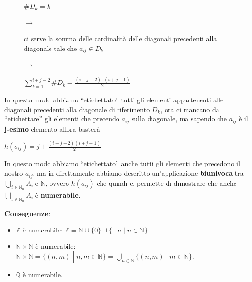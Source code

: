 \begin{figure}[h]
    \centering
    \begin{minipage}[t]{0.15\textwidth}
        \centering
        $\#D_k = k$
    \end{minipage}
    $\rightarrow$
    \begin{minipage}[t]{0.4\textwidth}
        \centering
        ci serve la somma delle cardinalità delle diagonali precedenti alla diagonale tale che $a_{ij} \in D_k$
    \end{minipage}
    $\rightarrow$
    \begin{minipage}[t]{0.35\textwidth}
        \centering
        $\sum^{i+j-2}_{k=1} \#D_k = \frac{(i + j - 2) \cdot (i + j - 1)}{2}$
    \end{minipage}
\end{figure}
In questo modo abbiamo ``etichettato'' tutti gli elementi appartenenti alle diagonali precedenti alla diagonale di riferimento $D_k$, ora ci mancano da ``etichettare'' gli elementi che precendo $a_{ij}$ sulla diagonale, ma sapendo che $a_{ij}$ è il \textbf{j-esimo} elemento allora basterà:
\begin{center}
    $h(a_{ij}) = j + \frac{(i + j - 2)(i + j - 1)}{2}$
\end{center}
In questo modo abbiamo ``etichettato'' anche tutti gli elementi che precedono il nostro $a_{ij}$, ma in direttamente abbiamo descritto un'applicazione \textbf{biunivoca} tra $\bigcup_{i \in \mathbb{N}_n} A_i$ e $\mathbb{N}$, ovvero $h(a_{ij})$ che quindi ci permette di dimostrare che anche $\bigcup_{i \in \mathbb{N}_n} A_i$ è \textbf{numerabile}.

\textbf{Conseguenze}:
\begin{itemize}[nosep]
    \item $\mathbb{Z}$ è numerabile: $\mathbb{Z} = \mathbb{N} \cup \{0\} \cup \{ -n \; | \; n \in \mathbb{N}\}$.
    \item $\mathbb{N} \times \mathbb{N}$ è numerabile: $\mathbb{N} \times \mathbb{N} = \{(n, m) \; | \; n, m \in \mathbb{N}\} = \bigcup_{n \in \mathbb{N}} \{(n, m) \; | \; m \in \mathbb{N}\}$.
    \item $\mathbb{Q}$ è numerabile.
\end{itemize}

